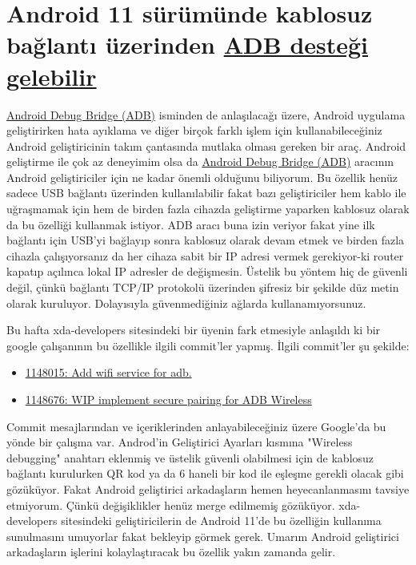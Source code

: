 \documentclass[11pt]{article}
\begin{document}
\section{Android 11 sürümünde kablosuz bağlantı üzerinden \href{https://www.xda-developers.com/android-11-native-wireless-adb/}{ADB desteği gelebilir}}
\label{sec:org6f7f5cb}
\href{https://www.xda-developers.com/install-adb-windows-macos-linux/}{Android Debug Bridge (ADB)} isminden de anlaşılacağı üzere, Android uygulama
geliştirirken hata ayıklama ve diğer birçok farklı işlem için
kullanabileceğiniz Android geliştiricinin takım çantasında mutlaka olması
gereken bir araç. Android geliştirme ile çok az deneyimim olsa da \href{https://www.xda-developers.com/install-adb-windows-macos-linux/}{Android Debug
Bridge (ADB)} aracının Android geliştiriciler için ne kadar önemli olduğunu
biliyorum. Bu özellik henüz sadece USB bağlantı üzerinden kullanılabilir fakat
bazı geliştiriciler hem kablo ile uğraşmamak için hem de birden fazla cihazda
geliştirme yaparken kablosuz olarak da bu özelliği kullanmak istiyor. ADB aracı
buna izin veriyor fakat yine ilk bağlantı için USB'yi bağlayıp sonra kablosuz
olarak devam etmek ve birden fazla cihazla çalışıyorsanız da her cihaza sabit
bir IP adresi vermek gerekiyor-ki router kapatıp açılınca lokal IP adresler de
değişmesin. Üstelik bu yöntem hiç de güvenli değil, çünkü bağlantı TCP/IP
protokolü üzerinden şifresiz bir şekilde düz metin olarak kuruluyor.
Dolayısıyla güvenmediğiniz ağlarda kullanamıyorsunuz.

Bu hafta xda-developers sitesindeki bir üyenin fark etmesiyle anlaşıldı ki bir
google çalışanının bu özellikle ilgili commit'ler yapmış. İlgili commit'ler şu
şekilde:
\begin{itemize}
\item \href{https://android-review.googlesource.com/c/platform/system/core/+/1148015}{1148015: Add wifi service for adb.}
\item \href{https://android-review.googlesource.com/c/platform/system/core/+/1148676}{1148676: WIP implement secure pairing for ADB Wireless}
\end{itemize}
Commit mesajlarından ve içeriklerinden anlayabileceğiniz üzere Google'da bu
yönde bir çalışma var. Androd'in Geliştirici Ayarları kısmına "Wireless
debugging" anahtarı eklenmiş ve üstelik güvenli olabilmesi için de kablosuz
bağlantı kurulurken QR kod ya da 6 haneli bir kod ile eşleşme gerekli olacak
gibi gözüküyor. Fakat Android geliştirici arkadaşların hemen heyecanlanmasını
tavsiye etmiyorum. Çünkü değişiklikler henüz merge edilmemiş gözüküyor.
xda-developers sitesindeki geliştiricilerin de Android 11'de bu özelliğin
kullanıma sunulmasını umuyorlar fakat bekleyip görmek gerek. Umarım Android
geliştirici arkadaşların işlerini kolaylaştıracak bu özellik yakın zamanda
gelir.
\end{document}
